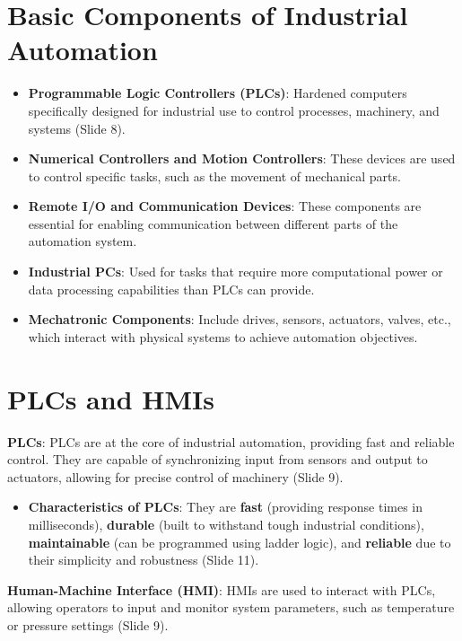 \documentclass[
  14pt,
  a4paper,
  numbers=noendperiod,
  headinclude=true,
  footinclude=true,
  DIV=calc]{scrreprt}
\providecommand{\tightlist}{%
  \setlength{\itemsep}{0pt}\setlength{\parskip}{0pt}}\usepackage{longtable,booktabs,array}
\begin{document}
\section{Basic Components of Industrial
Automation}\label{basic-components-of-industrial-automation}

\begin{itemize}
\tightlist
\item
  \textbf{Programmable Logic Controllers (PLCs)}: Hardened computers
  specifically designed for industrial use to control processes,
  machinery, and systems (Slide 8).
\item
  \textbf{Numerical Controllers and Motion Controllers}: These devices
  are used to control specific tasks, such as the movement of mechanical
  parts.
\item
  \textbf{Remote I/O and Communication Devices}: These components are
  essential for enabling communication between different parts of the
  automation system.
\item
  \textbf{Industrial PCs}: Used for tasks that require more
  computational power or data processing capabilities than PLCs can
  provide.
\item
  \textbf{Mechatronic Components}: Include drives, sensors, actuators,
  valves, etc., which interact with physical systems to achieve
  automation objectives.
\end{itemize}

\section{PLCs and HMIs}\label{plcs-and-hmis}

\textbf{PLCs}: PLCs are at the core of industrial automation, providing
fast and reliable control. They are capable of synchronizing input from
sensors and output to actuators, allowing for precise control of
machinery (Slide 9).

\begin{itemize}
\tightlist
\item
  \textbf{Characteristics of PLCs}: They are \textbf{fast} (providing
  response times in milliseconds), \textbf{durable} (built to withstand
  tough industrial conditions), \textbf{maintainable} (can be programmed
  using ladder logic), and \textbf{reliable} due to their simplicity and
  robustness (Slide 11).
\end{itemize}

\textbf{Human-Machine Interface (HMI)}: HMIs are used to interact with
PLCs, allowing operators to input and monitor system parameters, such as
temperature or pressure settings (Slide 9).
\end{document}

